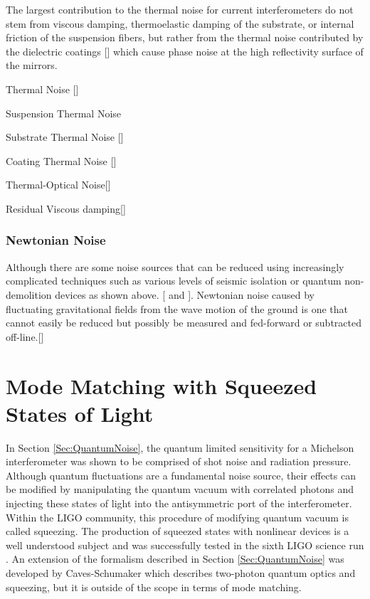 		The largest contribution to the thermal noise for current interferometers do not stem from viscous damping, thermoelastic damping of the substrate, or internal friction of the suspension fibers, but rather from the thermal noise contributed by the dielectric coatings [\cite{HarryThermalCoat}] which cause phase noise at the high reflectivity surface of the mirrors.
		
		
		Thermal Noise [\cite{SaulsonThermalNoise}]
		
		Suspension Thermal Noise \cite{SaulsonThermalSus}
		
		Substrate Thermal Noise [\cite{Saulson}]
		
		Coating Thermal Noise [\cite{HarryThermalCoat}]
		
		Thermal-Optical Noise[\cite{EvansBallmerThermalOptic}]
		
		Residual Viscous damping[\cite{Saulson}]
		
		\subsubsection{Newtonian Noise}
		Although there are some noise sources that can be reduced using increasingly complicated techniques such as various levels of seismic isolation or quantum non-demolition devices as shown above. [\cite{SaulsonNewtonian} and \cite{ThorneNewtonian}].  Newtonian noise caused by fluctuating gravitational fields from the wave motion of the ground is one that cannot easily be reduced but possibly be measured and fed-forward or subtracted off-line.[\cite{DriggersNewtonian}]

	\section{Mode Matching with Squeezed States of Light}
	In Section \ref{Sec:QuantumNoise}, the quantum limited sensitivity for a Michelson interferometer was shown to be comprised of shot noise and radiation pressure. Although quantum fluctuations are a fundamental noise source, their effects can be modified by manipulating the quantum vacuum with correlated photons and injecting these states of light into the antisymmetric port of the interferometer.  Within the LIGO community, this procedure of modifying quantum vacuum is called squeezing.  The production of squeezed states with nonlinear devices is a well understood subject and was successfully tested in the sixth LIGO science run \cite{LSCBeyondQM}\cite{LSCEnhancedSenseSqz}.  An extension of the formalism described in Section \ref{Sec:QuantumNoise} was developed by Caves-Schumaker \cite{Caves2photon} which describes two-photon quantum optics and squeezing, but it is outside of the scope in terms of mode matching. 
	
